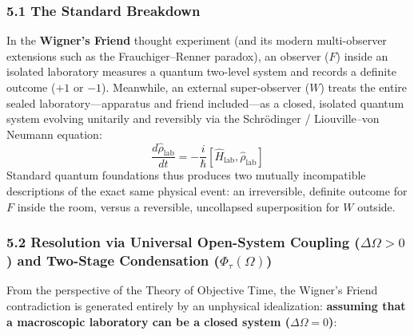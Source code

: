 \documentclass[
]{article}
\begin{document}
\subsubsection{5.1 The Standard
Breakdown}\label{the-standard-breakdown-3}

In the \textbf{Wigner's Friend} thought experiment (and its modern
multi-observer extensions such as the Frauchiger--Renner paradox), an
observer (\(F\)) inside an isolated laboratory measures a quantum
two-level system and records a definite outcome (\(+1\) or \(-1\)).
Meanwhile, an external super-observer (\(W\)) treats the entire sealed
laboratory---apparatus and friend included---as a closed, isolated
quantum system evolving unitarily and reversibly via the Schrödinger /
Liouville--von Neumann equation:
\[\frac{d\hat{\rho}_{\mathrm{lab}}}{dt} = -\frac{i}{\hbar}[\hat{H}_{\mathrm{lab}}, \hat{\rho}_{\mathrm{lab}}]\]
Standard quantum foundations thus produces two mutually incompatible
descriptions of the exact same physical event: an irreversible, definite
outcome for \(F\) inside the room, versus a reversible, uncollapsed
superposition for \(W\) outside.

\subsubsection{\texorpdfstring{5.2 Resolution via Universal Open-System
Coupling (\(\Delta\Omega > 0\)) and Two-Stage Condensation
(\(\Phi_\tau(\Omega)\))}{5.2 Resolution via Universal Open-System Coupling (\textbackslash Delta\textbackslash Omega \textgreater{} 0) and Two-Stage Condensation (\textbackslash Phi\_\textbackslash tau(\textbackslash Omega))}}\label{resolution-via-universal-open-system-coupling-deltaomega-0-and-two-stage-condensation-phi_tauomega}

From the perspective of the Theory of Objective Time, the Wigner's
Friend contradiction is generated entirely by an unphysical
idealization: \textbf{assuming that a macroscopic laboratory can be a
closed system (\(\Delta\Omega = 0\))}:
\end{document}
